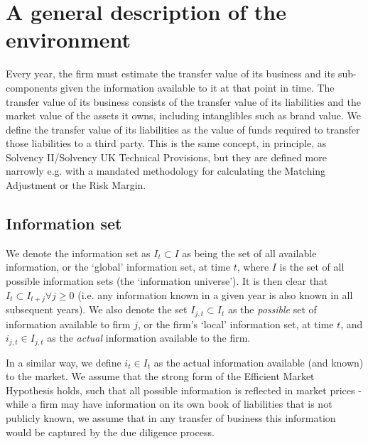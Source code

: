 \section{A general description of the environment} \label{section:general_description}
Every year, the firm must estimate the transfer value of its business and its
sub-components given the information available to it at that point in time. The
transfer value of its business consists of the transfer value of its
liabilities and the market value of the assets it owns, including intanglibles
such as brand value. We define the transfer value of its liabilities as the
value of funds required to transfer those liabilities to a third party. This is
the same concept, in principle, as Solvency II/Solvency UK Technical
Provisions, but they are defined more narrowly e.g. with a mandated methodology
for calculating the Matching Adjustment or the Risk Margin.

\subsection{Information set} \label{section:information_set}
We denote the information set as $I_t \subset I$ as being the set of all
available information, or the `global' information set, at time $t$, where $I$
is the set of all possible information sets (the `information universe'). It is
then clear that $I_t \subset I_{t+j} \forall j \geq 0$ (i.e. any information
known in a given year is also known in all subsequent years). We also denote
the set $I_{j,t} \subset I_t$ as the \textit{possible} set of information
available to firm $j$, or the firm's `local' information set, at time $t$, and
$i_{j,t} \in I_{j,t}$ as the \textit{actual} information available to the firm. 

In a similar way, we define $i_t \in I_t$ as the actual information
available (and known) to the market. We assume that the strong form of the
Efficient Market Hypothesis holds, such that all possible information is
reflected in market prices - while a firm may have information on its own book
of liabilities that is not publicly known, we assume that in any transfer of
business this information would be captured by the due diligence process.

